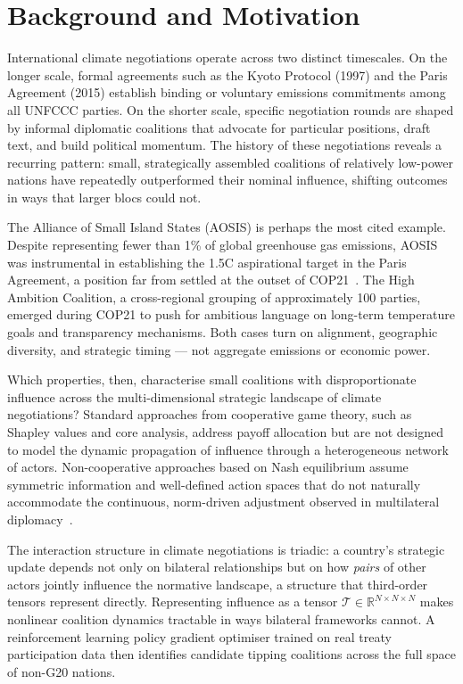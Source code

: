 \documentclass[11pt]{article}
\begin{document}
\section{Background and Motivation}
\label{sec:background}

International climate negotiations operate across two distinct timescales. On the longer scale, formal agreements such as the Kyoto Protocol (1997) and the Paris Agreement (2015) establish binding or voluntary emissions commitments among all UNFCCC parties. On the shorter scale, specific negotiation rounds are shaped by informal diplomatic coalitions that advocate for particular positions, draft text, and build political momentum. The history of these negotiations reveals a recurring pattern: small, strategically assembled coalitions of relatively low-power nations have repeatedly outperformed their nominal influence, shifting outcomes in ways that larger blocs could not.

The Alliance of Small Island States (AOSIS) is perhaps the most cited example. Despite representing fewer than 1\% of global greenhouse gas emissions, AOSIS was instrumental in establishing the 1.5\textdegree C aspirational target in the Paris Agreement, a position far from settled at the outset of COP21~\cite{aosis2023, betzold2012aosis}. The High Ambition Coalition, a cross-regional grouping of approximately 100 parties, emerged during COP21 to push for ambitious language on long-term temperature goals and transparency mechanisms. Both cases turn on alignment, geographic diversity, and strategic timing --- not aggregate emissions or economic power.

Which properties, then, characterise small coalitions with disproportionate influence across the multi-dimensional strategic landscape of climate negotiations? Standard approaches from cooperative game theory, such as Shapley values and core analysis, address payoff allocation but are not designed to model the dynamic propagation of influence through a heterogeneous network of actors. Non-cooperative approaches based on Nash equilibrium assume symmetric information and well-defined action spaces that do not naturally accommodate the continuous, norm-driven adjustment observed in multilateral diplomacy~\cite{barrett1994self, carraro1993strategies, nordhaus2015climate}.

The interaction structure in climate negotiations is triadic: a country's strategic update depends not only on bilateral relationships but on how \emph{pairs} of other actors jointly influence the normative landscape, a structure that third-order tensors represent directly. Representing influence as a tensor $\mathcal{T} \in \mathbb{R}^{N \times N \times N}$ makes nonlinear coalition dynamics tractable in ways bilateral frameworks cannot. A reinforcement learning policy gradient optimiser trained on real treaty participation data then identifies candidate tipping coalitions across the full space of non-G20 nations.
\end{document}
